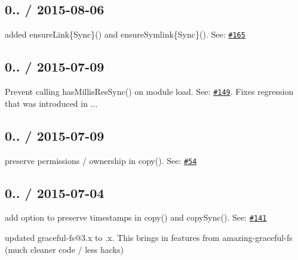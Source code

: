 \subsection*{0.. / 2015-\/08-\/06 }


\begin{DoxyItemize}
\item added {\ttfamily ensure\+Link\{Sync\}()} and {\ttfamily ensure\+Symlink\{Sync\}()}. See\+: \href{https://github.com/jprichardson/node-fs-extra/pull/165}{\tt \#165}
\end{DoxyItemize}

\subsection*{0.. / 2015-\/07-\/09 }


\begin{DoxyItemize}
\item Prevent calling {\ttfamily has\+Millis\+Res\+Sync()} on module load. See\+: \href{https://github.com/jprichardson/node-fs-extra/issues/149}{\tt \#149}. Fixes regression that was introduced in {..}.
\end{DoxyItemize}

\subsection*{0.. / 2015-\/07-\/09 }


\begin{DoxyItemize}
\item preserve permissions / ownership in {\ttfamily copy()}. See\+: \href{https://github.com/jprichardson/node-fs-extra/issues/54}{\tt \#54}
\end{DoxyItemize}

\subsection*{0.. / 2015-\/07-\/04 }


\begin{DoxyItemize}
\item add option to preserve timestamps in {\ttfamily copy()} and {\ttfamily copy\+Sync()}. See\+: \href{https://github.com/jprichardson/node-fs-extra/pull/141}{\tt \#141}
\item updated {\ttfamily graceful-\/fs@3.\+x} to {.\+x}. This brings in features from {\ttfamily amazing-\/graceful-\/fs} (much cleaner code / less hacks)
\end{DoxyItemize}

